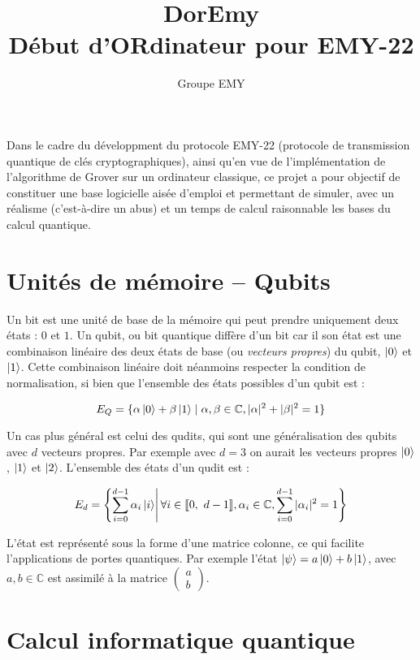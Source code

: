 \documentclass[french]{article}
\title{%
    DorEmy \\
    \large Début d'ORdinateur pour EMY-22}
\author{Groupe EMY}
\newcommand{\somme}{\displaystyle\sum}
\newcommand{\entiers}[2]{\llbracket #1,\ #2\rrbracket} %
\begin{document}
\maketitle

Dans le cadre du développment du protocole EMY-22 (protocole de transmission quantique de clés cryptographiques), ainsi qu'en vue de l'implémentation de l'algorithme de Grover sur un ordinateur classique, ce projet a pour objectif de constituer une base logicielle aisée d'emploi et permettant de simuler, avec un réalisme (c'est-à-dire un abus) et un temps de calcul raisonnable les bases du calcul quantique.


\section{Unités de mémoire – Qubits}

Un bit est une unité de base de la mémoire qui peut prendre uniquement deux états : $0$ et $1$. Un qubit, ou bit quantique diffère d'un bit car il son état est une combinaison linéaire des deux états de base (ou \textit{vecteurs propres}) du qubit, $\ket{0}$ et $\ket{1}$. Cette combinaison linéaire doit néanmoins respecter la condition de normalisation, si bien que l'ensemble des états possibles d'un qubit est :

\[ E_Q = \{\alpha \ket 0 + \beta \ket 1 \mid \alpha, \beta \in \mathbb{C}, |\alpha|^2 + |\beta|^2 = 1\} \]

Un cas plus général est celui des qudits, qui sont une généralisation des qubits avec $d$ vecteurs propres. Par exemple avec $d = 3$ on aurait les vecteurs propres $\ket 0$, $\ket 1$ et $\ket 2$. L'ensemble des états d'un qudit est :

$$ E_d = \left\{ \somme_{i = 0}^{d - 1} \alpha_i \ket i \middle|\, \forall i \in \entiers{0}{d-1}, \alpha_i \in \mathbb{C},  \somme_{i = 0}^{d - 1} |\alpha_i|^2 = 1\right\} $$

L'état est représenté sous la forme d'une matrice colonne, ce qui facilite l'applications de portes quantiques. Par exemple l'état $\ket \psi = a \ket 0 + b \ket 1$, avec $a, b \in \mathbb{C}$ est assimilé à la matrice $\left(\begin{smallmatrix} a \\ b\end{smallmatrix}\right)$.


\section{Calcul informatique quantique}
\end{document}
